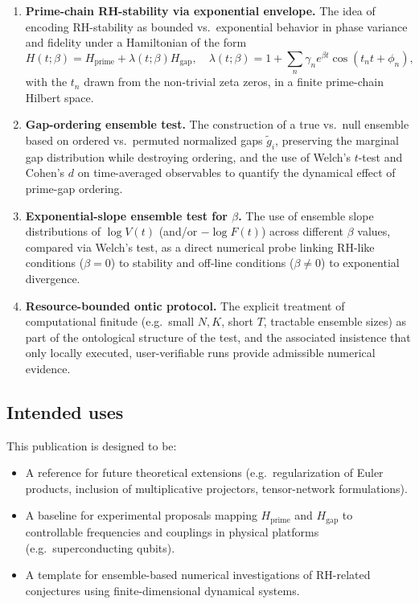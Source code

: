 \documentclass[11pt]{article}
\begin{document}
\begin{enumerate}
  \item \textbf{Prime-chain RH-stability via exponential envelope.} The idea of encoding RH-stability as bounded vs.\ exponential behavior in phase variance and fidelity under a Hamiltonian of the form
  \[
  H(t;\beta)=H_{\mathrm{prime}}+\lambda(t;\beta)H_{\mathrm{gap}},\quad
  \lambda(t;\beta)=1+\sum_n \gamma_n e^{\beta t}\cos(t_n t+\phi_n),
  \]
  with the $t_n$ drawn from the non-trivial zeta zeros, in a finite prime-chain Hilbert space.
  \item \textbf{Gap-ordering ensemble test.} The construction of a true vs.\ null ensemble based on ordered vs.\ permuted normalized gaps $\tilde g_i$, preserving the marginal gap distribution while destroying ordering, and the use of Welch's $t$-test and Cohen's $d$ on time-averaged observables to quantify the dynamical effect of prime-gap ordering.
  \item \textbf{Exponential-slope ensemble test for $\beta$.} The use of ensemble slope distributions of $\log V(t)$ (and/or $-\log F(t)$) across different $\beta$ values, compared via Welch's test, as a direct numerical probe linking RH-like conditions ($\beta=0$) to stability and off-line conditions ($\beta\neq 0$) to exponential divergence.
  \item \textbf{Resource-bounded ontic protocol.} The explicit treatment of computational finitude (e.g.\ small $N,K$, short $T$, tractable ensemble sizes) as part of the ontological structure of the test, and the associated insistence that only locally executed, user-verifiable runs provide admissible numerical evidence.
\end{enumerate}

\subsection{Intended uses}

This publication is designed to be:
\begin{itemize}
  \item A reference for future theoretical extensions (e.g.\ regularization of Euler products, inclusion of multiplicative projectors, tensor-network formulations).
  \item A baseline for experimental proposals mapping $H_{\mathrm{prime}}$ and $H_{\mathrm{gap}}$ to controllable frequencies and couplings in physical platforms (e.g.\ superconducting qubits).
  \item A template for ensemble-based numerical investigations of RH-related conjectures using finite-dimensional dynamical systems.
\end{itemize}
\end{document}
